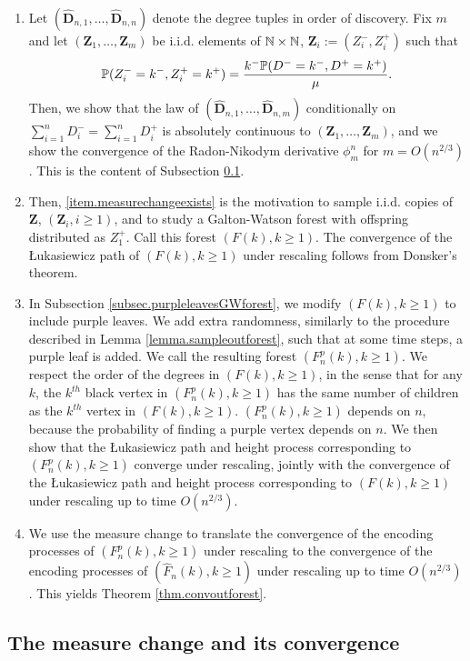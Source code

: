 \begin{enumerate}
    \item \label{item.measurechangeexists} Let $(\mathbf{\hat{D}}_{n,1},\dots,\mathbf{\hat{D}}_{n,n})$ denote the degree tuples in order of discovery. Fix $m$ and let $(\mathbf{Z}_1,\dots, \mathbf{Z}_m)$ be i.i.d. elements of $\N\times \N$, $\mathbf{Z}_i:=(Z_i^-,Z_i^+)$ such that 
    $$\P(Z_i^-=k^-, Z_i^+=k^+)=\frac{k^-\P(D^-=k^-,D^+=k^+)}{\mu}.$$
    Then, we show that the law of $(\mathbf{\hat{D}}_{n,1},\dots,\mathbf{\hat{D}}_{n,m})$ conditionally on $\sum_{i=1}^n D_i^-=\sum_{i=1}^n D_i^+$ is absolutely continuous to $(\mathbf{Z}_1,\dots, \mathbf{Z}_m)$, and we show the convergence of the Radon-Nikodym derivative $\phi_m^n$ for $m=O(n^{2/3})$. This is the content of Subsection \ref{subsec.measurechange}.
    \item Then, \ref{item.measurechangeexists} is the motivation to sample i.i.d. copies of $\mathbf{Z}$, $(\mathbf{Z}_i,i\geq 1)$, and to study a Galton-Watson forest with offspring distributed as $Z_1^+$. Call this forest $(F(k),k\geq 1)$. The convergence of the \L ukasiewicz path of $(F(k),k\geq 1)$ under rescaling follows from Donsker's theorem.
    \item In Subsection \ref{subsec.purpleleavesGWforest}, we modify $(F(k),k\geq 1)$ to include purple leaves. We add extra randomness, similarly to the procedure described in Lemma \ref{lemma.sampleoutforest}, such that at some time steps, a purple leaf is added. We call the resulting forest $(F^p_n(k),k\geq 1)$. We respect the order of the degrees in $(F(k),k\geq 1)$, in the sense that for any $k$, the $k^{th}$ black vertex in $(F^p_n(k),k\geq 1)$ has the same number of children as the $k^{th}$ vertex in $(F(k),k\geq 1)$. $(F^p_n(k),k\geq 1)$ depends on $n$, because the probability of finding a purple vertex depends on $n$. We then show that the \L ukasiewicz path and height process corresponding to $(F^p_n(k),k\geq 1)$ converge under rescaling, jointly with the convergence of the \L ukasiewicz path and height process corresponding to $(F(k),k\geq 1)$ under rescaling up to time $O(n^{2/3})$.
    \item We use the measure change to translate the convergence of the encoding processes of $(F^p_n(k),k\geq 1)$ under rescaling to the convergence of the encoding processes of $(\hat{F}_n(k),k\geq 1)$ under rescaling up to time $O(n^{2/3})$. This yields Theorem \ref{thm.convoutforest}. 
\end{enumerate}

\subsection{The measure change and its convergence}\label{subsec.measurechange}

